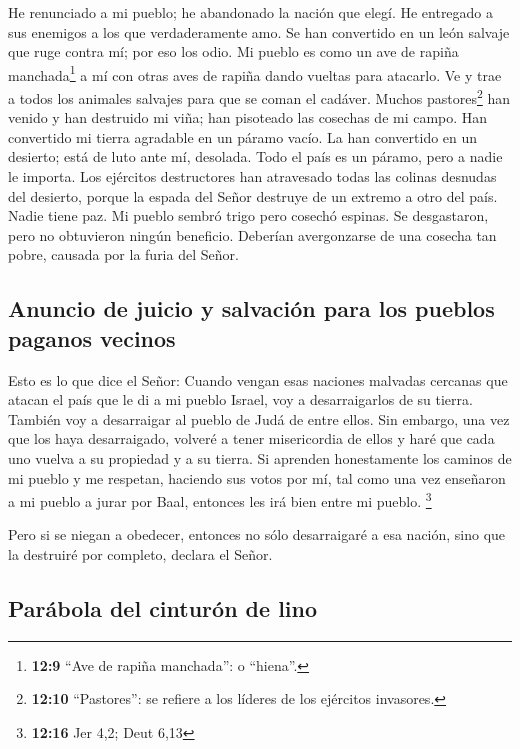  He renunciado a mi pueblo; he abandonado la nación que
elegí. He entregado a sus enemigos a los que verdaderamente amo.
 Se han convertido en un león salvaje que ruge contra mí;
por eso los odio.  Mi pueblo es como un ave de rapiña
manchada\footnote{\textbf{12:9} ``Ave de rapiña manchada'': o ``hiena''.}
a mí con otras aves de rapiña dando vueltas para atacarlo. Ve y trae a
todos los animales salvajes para que se coman el cadáver.
 Muchos pastores\footnote{\textbf{12:10} ``Pastores'': se
  refiere a los líderes de los ejércitos invasores.} han venido y han
destruido mi viña; han pisoteado las cosechas de mi campo. Han
convertido mi tierra agradable en un páramo vacío.  La
han convertido en un desierto; está de luto ante mí, desolada. Todo el
país es un páramo, pero a nadie le importa.  Los
ejércitos destructores han atravesado todas las colinas desnudas del
desierto, porque la espada del Señor destruye de un extremo a otro del
país. Nadie tiene paz.  Mi pueblo sembró trigo pero
cosechó espinas. Se desgastaron, pero no obtuvieron ningún beneficio.
Deberían avergonzarse de una cosecha tan pobre, causada por la furia del
Señor.

\hypertarget{anuncio-de-juicio-y-salvaciuxf3n-para-los-pueblos-paganos-vecinos}{%
\subsection{Anuncio de juicio y salvación para los pueblos paganos
vecinos}\label{anuncio-de-juicio-y-salvaciuxf3n-para-los-pueblos-paganos-vecinos}}

 Esto es lo que dice el Señor: Cuando vengan esas
naciones malvadas cercanas que atacan el país que le di a mi pueblo
Israel, voy a desarraigarlos de su tierra. También voy a desarraigar al
pueblo de Judá de entre ellos.  Sin embargo, una vez que
los haya desarraigado, volveré a tener misericordia de ellos y haré que
cada uno vuelva a su propiedad y a su tierra.  Si
aprenden honestamente los caminos de mi pueblo y me respetan, haciendo
sus votos por mí, tal como una vez enseñaron a mi pueblo a jurar por
Baal, entonces les irá bien entre mi pueblo. \footnote{\textbf{12:16}
  Jer 4,2; Deut 6,13}

 Pero si se niegan a obedecer, entonces no sólo
desarraigaré a esa nación, sino que la destruiré por completo, declara
el Señor.

\hypertarget{paruxe1bola-del-cinturuxf3n-de-lino}{%
\subsection{Parábola del cinturón de
lino}\label{paruxe1bola-del-cinturuxf3n-de-lino}}

